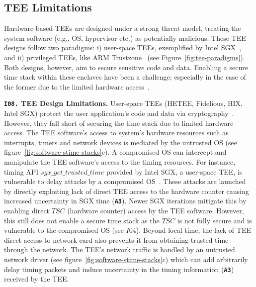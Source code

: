 \subsection{TEE Limitations}\label{subsec:tee-limitation}
Hardware-based TEEs are designed under a strong threat model, treating the system software (e.g., OS, hypervisor etc.) as potentially malicious. These TEE designs follow two paradigms: i) user-space TEEs, exemplified by Intel SGX~\cite{intel-sgx-explained}, and ii) privileged TEEs, like ARM Trustzone~\cite{sok-trustzone-cves} (see Figure~\ref{fig:tee-paradigms}). Both designs, however, aim to secure sensitive code and data. Enabling a secure time stack within these enclaves have been a challenge; especially in the case of the former due to the limited hardware access~\cite{time-stack-abouttime}. 

\noindent\textbf{\texttt{I08.} TEE Design Limitations.}
User-space TEEs (HETEE, Fidelious, HIX, Intel SGX) protect the user application's code and data via cryptography~\cite{sok-hardware-tee}. However, they fall short of securing the time stack due to limited hardware access. The TEE software's access to system's hardware resources such as interrupts, timers and network devices is mediated by the untrusted OS (see figure~\ref{fig:software-stime-stacks}c). A compromised OS can intercept and manipulate the TEE software's access to the timing resources. For instance, timing API $sgx\_get\_trusted\_time$ provided by Intel SGX, a user-space TEE, is vulnerable to delay attacks by a compromised OS~\cite{time-stack-timeseal}. These attacks are launched by directly exploiting lack of direct TEE access to the hardware counter causing increased uncertainty in SGX time (\textbf{\texttt{A3}}). Newer SGX iterations mitigate this by enabling direct $TSC$ (hardware counter) access by the TEE software. However, this still does not enable a secure time stack as the $TSC$ is not fully secure and is vulnerable to the compromised OS (see $I04$). Beyond local time, the lack of TEE direct access to network card also prevents it from obtaining trusted time through the network. The TEE's network traffic is handled by an untrusted network driver (see figure~\ref{fig:software-stime-stacks}c) which can add arbitrarily delay timing packets and induce uncertainty in the timing information (\textbf{\texttt{A3}}) received by the TEE.

